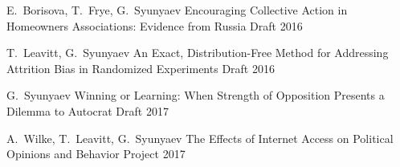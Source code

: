 \begin{cventries}

  \cventry
    {E.~Borisova, T.~Frye, G.~Syunyaev} %
    {Encouraging Collective Action in Homeowners Associations: Evidence from Russia} %
    {Draft} %
    {2016} %
    {
    }

  \cventry
    {T.~Leavitt, G.~Syunyaev} %
    {An Exact, Distribution-Free Method for Addressing Attrition Bias in Randomized Experiments} %
    {Draft} %
    {2016} %
    {
    }

  \cventry
    {G.~Syunyaev} %
    {Winning or Learning: When Strength of Opposition Presents a Dilemma to Autocrat} %
    {Draft} %
    {2017} %
    {
    }

\end{cventries}

\begin{cventries}

  \cventry
    {A.~Wilke, T.~Leavitt, G.~Syunyaev} %
    {The Effects of Internet Access on Political Opinions and Behavior} %
    {Project} %
    {2017} %
    {
    }

\end{cventries}
